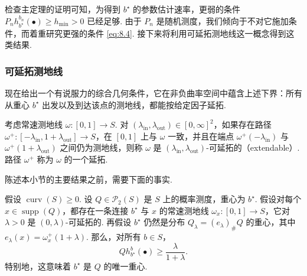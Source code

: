 检查主定理的证明可知，为得到 $b^\star$ 的参数估计速率，更弱的条件 $P_nh_{b^\star}^{b_n}(\bullet)\ge h_{\min}>0$ 已经足够. 由于 $P_n$ 是随机测度，我们倾向于不对它施加条件，而着重研究更强的条件 \eqref{eq:8.4}. 接下来将利用可延拓测地线这一概念得到这类结果.

\subsubsection{可延拓测地线}\label{sec:8.2.2}
现在给出一个有说服力的综合几何条件，它在非负曲率空间中蕴含上述下界：所有从重心 $b^\star$ 出发以及到达该点的测地线，都能按给定因子延拓.
\begin{definition}[可延拓测地线]\label{def:8.6}
考虑常速测地线 $\omega:[0,1]\to S$. 对 $(\lambda_{\mathrm{in}},\lambda_{\mathrm{out}})\in[0,\infty]^2$，如果存在路径 $\omega^+:[-\lambda_{\mathrm{in}},1+\lambda_{\mathrm{out}}]\to S$，在 $[0,1]$ 上与 $\omega$ 一致，并且在端点 $\omega^+(-\lambda_{\mathrm{in}})$ 与 $\omega^+(1+\lambda_{\mathrm{out}})$ 之间仍为测地线，则称 $\omega$ 是 $(\lambda_{\mathrm{in}},\lambda_{\mathrm{out}})$-可延拓的（extendable）. 路径 $\omega^+$ 称为 $\omega$ 的一个延拓.
\end{definition}
陈述本小节的主要结果之前，需要下面的事实.
\begin{theorem}\label{thm:8.7}
假设 $\operatorname{curv}(S)\ge0$. 设 $Q\in\mathcal P_2(S)$ 是 $S$ 上的概率测度，重心为 $b^\star$. 假设对每个 $x\in\operatorname{supp}(Q)$，都存在一条连接 $b^\star$ 与 $x$ 的常速测地线 $\omega_x:[0,1]\to S$，它对 $\lambda>0$ 是 $(0,\lambda)$-可延拓的. 再假设 $b^\star$ 仍然是分布 $Q_\lambda=(e_\lambda)_\#Q$ 的重心，其中 $e_\lambda(x)=\omega_x^+(1+\lambda)$. 那么，对所有 $b\in S$，
\begin{equation}\label{eq:8.7}
Qh_{b^\star}^b(\bullet)\ge\frac\lambda{1+\lambda}.
\end{equation}
特别地，这意味着 $b^\star$ 是 $Q$ 的唯一重心.
\end{theorem}
